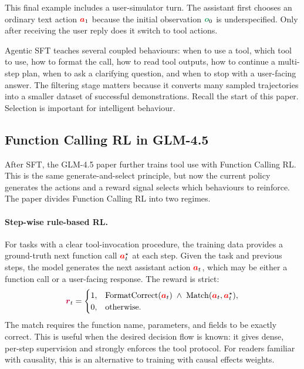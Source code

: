\documentclass{article}
\newcommand{\colsym}[2]{\ensuremath{\textcolor{#1}{\boldsymbol{#2}}}}
\newcommand{\action}{\colsym{red}{a}}
\newcommand{\obs}{\colsym{ForestGreen}{o}}
\newcommand{\reward}{\colsym{purple}{r}}
\begin{document}
This final example includes a user-simulator turn. The assistant first chooses an ordinary text action ${\action}_1$ because the initial observation ${\obs}_0$ is underspecified. Only after receiving the user reply does it switch to tool actions.


Agentic SFT teaches several coupled behaviours: when to use a tool, which tool to use, how to format the call, how to read tool outputs, how to continue a multi-step plan, when to ask a clarifying question, and when to stop with a user-facing answer.
The filtering stage matters because it converts many sampled trajectories into a smaller dataset of successful demonstrations. Recall the start of this paper. Selection is important for intelligent behaviour.


\subsection{Function Calling RL in GLM-4.5}

After SFT, the GLM-4.5 paper further trains tool use with Function Calling RL.
This is the same generate-and-select principle, but now the current policy generates the actions and a reward signal selects which behaviours to reinforce.
The paper divides Function Calling RL into two regimes.

\paragraph{Step-wise rule-based RL.}
For tasks with a clear tool-invocation procedure, the training data provides a ground-truth next function call ${\action}_t^{\star}$ at each step.
Given the task and previous steps, the model generates the next assistant action ${\action}_t$, which may be either a function call or a user-facing response.
The reward is strict:
\[
    {\reward}_t
    =
    \begin{cases}
    1, & \mathrm{FormatCorrect}({\action}_t)
         \;\wedge\;
         \mathrm{Match}({\action}_t,{\action}_t^{\star}), \\
    0, & \mathrm{otherwise}.
    \end{cases}
\]
The match requires the function name, parameters, and fields to be exactly correct. This is useful when the desired decision flow is known: it gives dense, per-step supervision and strongly enforces the tool protocol. For readers familiar with causality, this is an alternative to training with causal effects weights.
\end{document}
